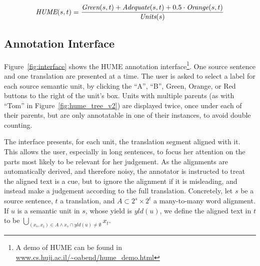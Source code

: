 \documentclass[11pt,letterpaper]{article}
\newcommand{\figref}[1]{Figure~\ref{#1}}
\def\func#1{\text{\it #1}}  %
\def\HUME{\func{HUME}}
\def\Adequate{\func{Adequate}}
\def\Green{\func{Green}}
\def\Orange{\func{Orange}}
\def\Units{\func{Units}}
\begin{document}
\vspace{-.3cm}

{\scriptsize
\begin{equation}
  \HUME(s,t) = \frac{\Green(s,t) + \Adequate(s,t) + 0.5\cdot \Orange(s,t)}{\Units(s)}
  \nonumber
\end{equation}
}

\vspace{-.5cm}


\subsection{Annotation Interface}

\figref{fig:interface} shows the HUME annotation interface\footnote{A demo of HUME
  can be found in \url{www.cs.huji.ac.il/~oabend/hume_demo.html}}.
One source sentence and one translation are presented at a time.
The user is asked to select a label for each source semantic unit,
by clicking the ``A'', ``B'', Green, Orange, or Red buttons to the right of the unit's box.
Units with multiple parents (as with ``Tom'' in \figref{fig:hume_tree_v2}) are displayed
twice, once under each of their parents, but are only annotatable in one of
their instances, to avoid double counting.

The interface presents, for each unit, the translation segment aligned with it.
This allows the user, especially in long sentences, to focus her attention on the parts
most likely to be relevant for her judgement. As the alignments are automatically derived,
and therefore noisy, the annotator is instructed to treat the aligned text is a cue, but to ignore
the alignment if it is misleading, and instead 
make a judgement according to the full translation.
Concretely, let $s$ be a source sentence, $t$ a translation,
and $A \subset 2^s \times 2^t$ a many-to-many word alignment.
If $u$ is a semantic unit in $s$, whose yield is $yld(u)$, we define the aligned text in
$t$ to be $\bigcup_{(x_s,x_t) \in A \wedge x_s \cap yld(u) \neq \emptyset} x_t$.
\end{document}
